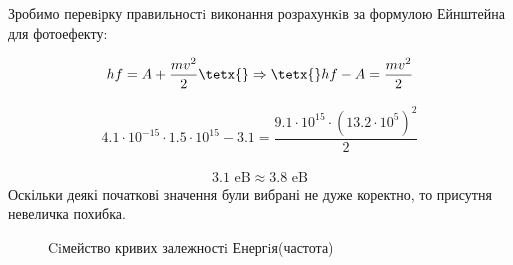 \documentclass[a4paper,14pt]{extreport}
\begin{document}
	
	\begin{center}
	\end{center}
	Зробимо перевiрку правильностi виконання розрахункiв за формулою
	Ейнштейна для фотоефекту:

	\begin{align*}
		hf = A + \dfrac{mv^2}{2}\tetx{  }\Rightarrow \tetx{  } hf -  A =  \dfrac{mv^2}{2}
	\end{align*}

	\begin{align*}
		4.1\cdot 10^{-15}\cdot 1.5\cdot 10^{15} - 3.1 =  \dfrac{9.1\cdot 10^{15}\cdot (13.2\cdot10^5)^2}{2}
	\end{align*}
	
	\begin{align*}
		3.1\text{  eB} \approx  3.8\text{  eB} %
	\end{align*}
	Оскільки деякі початкові значення були вибрані не дуже коректно, то присутня невеличка похибка.


	\begin{center}
	\end{center}

	\begin{center}
	\end{center}
	
	

 \newpage
	\begin{center}
	\end{center}
	
	\begin{figure}[h!]
		\caption{Ciмейство кривих залежностi Енергiя(частота) }
		\label{ris2}
	\end{figure}
\end{document}
